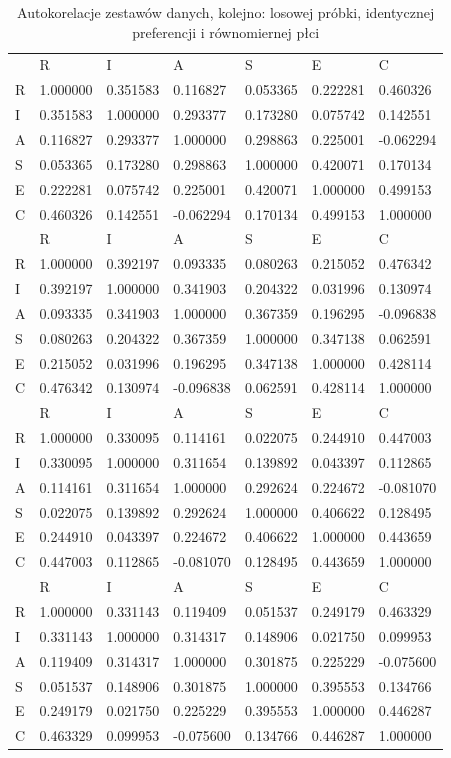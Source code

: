 \documentclass[12pt,a4paper,oneside]{report} %
\begin{document}
\begin{table}
\begin{tabular}{l|l|l|l|l|l|l}
\hline
 & R & I & A & S & E & C \\
R & 1.000000 & 0.351583 & 0.116827 & 0.053365 & 0.222281 & 0.460326 \\
I & 0.351583 & 1.000000 & 0.293377 & 0.173280 & 0.075742 & 0.142551 \\
A & 0.116827 & 0.293377 & 1.000000 & 0.298863 & 0.225001 & -0.062294 \\
S & 0.053365 & 0.173280 & 0.298863 & 1.000000 & 0.420071 & 0.170134 \\
E & 0.222281 & 0.075742 & 0.225001 & 0.420071 & 1.000000 & 0.499153 \\
C & 0.460326 & 0.142551 & -0.062294 & 0.170134 & 0.499153 & 1.000000 \\
\hline
 & R & I & A & S & E & C \\
R & 1.000000 & 0.392197 & 0.093335 & 0.080263 & 0.215052 & 0.476342 \\
I & 0.392197 & 1.000000 & 0.341903 & 0.204322 & 0.031996 & 0.130974 \\
A & 0.093335 & 0.341903 & 1.000000 & 0.367359 & 0.196295 & -0.096838 \\
S & 0.080263 & 0.204322 & 0.367359 & 1.000000 & 0.347138 & 0.062591 \\
E & 0.215052 & 0.031996 & 0.196295 & 0.347138 & 1.000000 & 0.428114 \\
C & 0.476342 & 0.130974 & -0.096838 & 0.062591 & 0.428114 & 1.000000 \\
\hline
 & R & I & A & S & E & C \\
R & 1.000000 & 0.330095 & 0.114161 & 0.022075 & 0.244910 & 0.447003 \\
I & 0.330095 & 1.000000 & 0.311654 & 0.139892 & 0.043397 & 0.112865 \\
A & 0.114161 & 0.311654 & 1.000000 & 0.292624 & 0.224672 & -0.081070 \\
S & 0.022075 & 0.139892 & 0.292624 & 1.000000 & 0.406622 & 0.128495 \\
E & 0.244910 & 0.043397 & 0.224672 & 0.406622 & 1.000000 & 0.443659 \\
C & 0.447003 & 0.112865 & -0.081070 & 0.128495 & 0.443659 & 1.000000 \\
\hline
 & R & I & A & S & E & C \\ 
R & 1.000000 & 0.331143 & 0.119409 & 0.051537 & 0.249179 & 0.463329 \\ 
I & 0.331143 & 1.000000 & 0.314317 & 0.148906 & 0.021750 & 0.099953 \\ 
A & 0.119409 & 0.314317 & 1.000000 & 0.301875 & 0.225229 & -0.075600 \\ 
S & 0.051537 & 0.148906 & 0.301875 & 1.000000 & 0.395553 & 0.134766 \\ 
E & 0.249179 & 0.021750 & 0.225229 & 0.395553 & 1.000000 & 0.446287 \\ 
C & 0.463329 & 0.099953 & -0.075600 & 0.134766 & 0.446287 & 1.000000 \\ 
\hline
\end{tabular}
\caption{Autokorelacje zestawów danych, kolejno: losowej próbki, identycznej preferencji i równomiernej płci}
\label{autokorelacja}
\end{table}
\end{document}
